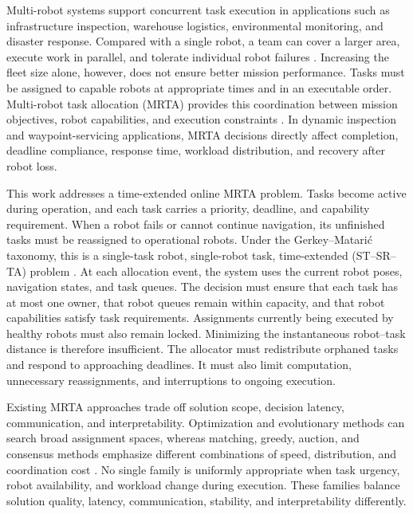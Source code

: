 \documentclass[10pt,letterpaper,onecolumn]{IEEEtran}
\begin{document}
Multi-robot systems support concurrent task execution in applications such as
infrastructure inspection, warehouse logistics, environmental monitoring, and
disaster response. Compared with a single robot, a team can cover a larger
area, execute work in parallel, and tolerate individual robot failures
\cite{khamis2015multi,chakraa2023review}. Increasing the fleet size alone,
however, does not ensure better mission performance. Tasks must be assigned to
capable robots at appropriate times and in an executable order. Multi-robot task
allocation (MRTA) provides this coordination between mission objectives, robot
capabilities, and execution constraints \cite{gerkey2004formal,
korsah2013comprehensive}. In dynamic inspection and waypoint-servicing
applications, MRTA decisions directly affect completion, deadline compliance,
response time, workload distribution, and recovery after robot loss.

This work addresses a time-extended online MRTA problem. Tasks become active
during operation, and each task carries a priority, deadline, and capability
requirement. When a robot fails or cannot continue navigation, its unfinished
tasks must be reassigned to operational robots. Under the Gerkey--Matari{\'c}
taxonomy, this is a single-task robot, single-robot task, time-extended
(ST--SR--TA) problem \cite{gerkey2004formal,nunes2017taxonomy}. At each
allocation event, the system uses the current robot poses, navigation states,
and task queues. The decision must ensure that each task has at most one owner,
that robot queues remain within capacity, and that robot capabilities satisfy
task requirements. Assignments currently being executed by healthy robots must
also remain locked. Minimizing the instantaneous robot--task distance is
therefore insufficient. The allocator must redistribute orphaned tasks and
respond to approaching deadlines. It must also limit computation, unnecessary
reassignments, and interruptions to ongoing execution.

Existing MRTA approaches trade off solution scope, decision latency,
communication, and interpretability. Optimization and evolutionary methods can
search broad assignment spaces, whereas matching, greedy, auction, and
consensus methods emphasize different combinations of speed, distribution, and
coordination cost \cite{chakraa2023review,bai2023group,
rostam2024selfadaptive}. No single family is uniformly appropriate when task
urgency, robot availability, and workload change during execution. These
families balance solution quality, latency, communication, stability, and
interpretability differently.
\end{document}
